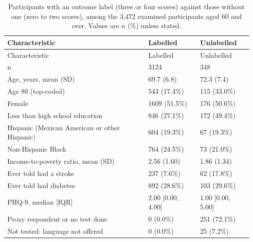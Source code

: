 \documentclass[11pt]{article}
\begin{document}
\begin{longtable}{L{7.2cm}R{3.6cm}R{3.6cm}}
\caption{Participants with an outcome label (three or four scores) against those without one (zero to two scores), among the 3,472 examined participants aged 60 and over. Values are $n$ (\%) unless stated.}\\
\toprule
Characteristic & Labelled & Unlabelled \\
\midrule
\endfirsthead
\toprule
Characteristic & Labelled & Unlabelled \\
\midrule
\endhead
\bottomrule
\endlastfoot
n & 3124 & 348 \\
Age, years, mean (SD) & 69.7 (6.8) & 72.3 (7.4) \\
Age 80 (top-coded) & 543 (17.4\%) & 115 (33.0\%) \\
Female & 1609 (51.5\%) & 176 (50.6\%) \\
Less than high school education & 846 (27.1\%) & 172 (49.4\%) \\
Hispanic (Mexican American or other Hispanic) & 604 (19.3\%) & 67 (19.3\%) \\
Non-Hispanic Black & 764 (24.5\%) & 73 (21.0\%) \\
Income-to-poverty ratio, mean (SD) & 2.56 (1.60) & 1.86 (1.34) \\
Ever told had a stroke & 237 (7.6\%) & 62 (17.8\%) \\
Ever told had diabetes & 892 (28.6\%) & 103 (29.6\%) \\
PHQ-9, median [IQR] & 2.00 [0.00, 4.00] & 1.00 [0.00, 5.00] \\
Proxy respondent or no test done & 0 (0.0\%) & 251 (72.1\%) \\
Not tested: language not offered & 0 (0.0\%) & 25 (7.2\%) \\
\end{longtable}
\end{document}
